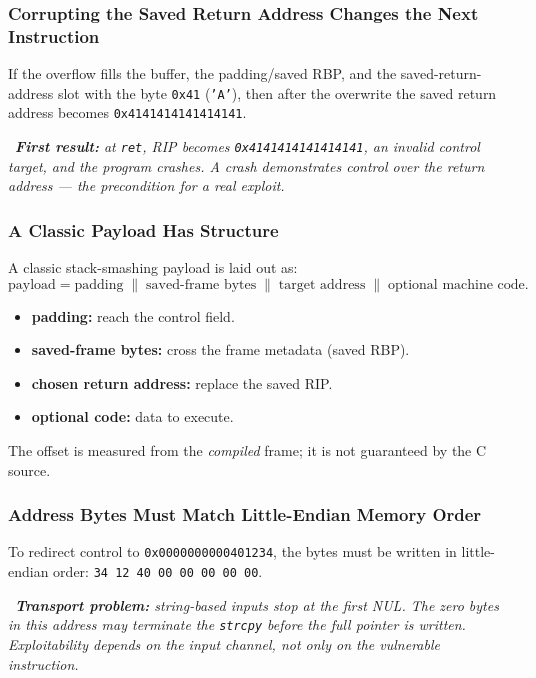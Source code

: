 \documentclass[hidelinks]{article}
\newcommand{\callout}[1]{\par\smallskip\noindent{\color{capri}$\blacktriangleright$}\ \textit{#1}\par\smallskip}
\begin{document}
\subsubsection{Corrupting the Saved Return Address Changes the Next Instruction}

If the overflow fills the buffer, the padding/saved RBP, and the saved-return-address slot with the byte \texttt{0x41} (\texttt{'A'}), then after the overwrite the saved return address becomes \texttt{0x4141414141414141}.

\callout{\textbf{First result:} at \texttt{ret}, RIP becomes \texttt{0x4141414141414141}, an invalid control target, and the program crashes. A crash demonstrates control over the return address --- the precondition for a real exploit.}

\subsubsection{A Classic Payload Has Structure}

A classic stack-smashing payload is laid out as:
\[
\text{payload} = \text{padding} \;\|\; \text{saved-frame bytes} \;\|\; \text{target address} \;\|\; \text{optional machine code}.
\]
\begin{itemize}
    \item \textbf{padding:} reach the control field.
    \item \textbf{saved-frame bytes:} cross the frame metadata (saved RBP).
    \item \textbf{chosen return address:} replace the saved RIP.
    \item \textbf{optional code:} data to execute.
\end{itemize}
The offset is measured from the \emph{compiled} frame; it is not guaranteed by the C source.

\subsubsection{Address Bytes Must Match Little-Endian Memory Order}

To redirect control to \texttt{0x0000000000401234}, the bytes must be written in little-endian order: \texttt{34 12 40 00 00 00 00 00}.

\callout{\textbf{Transport problem:} string-based inputs stop at the first NUL. The zero bytes in this address may terminate the \texttt{strcpy} \emph{before} the full pointer is written. Exploitability depends on the input channel, not only on the vulnerable instruction.}
\end{document}
